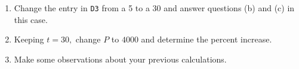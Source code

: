 \documentclass[12pt]{article}
\begin{document}
\begin{enumerate}
\begin{enumerate}
	\vfill
	
	

	\item Change the entry in \verb'D3' from a 5 to a 30 and answer questions (b) and (c) in this case.

	\vfill
	
	\item Keeping $t=30,$ change $P$ to $4000$ and determine the percent increase. 
	\vfill
	
	\item Make some observations about your previous  calculations.
	
	\vfill
	
	\vfill

\end{enumerate}

\end{enumerate}
\end{document}
